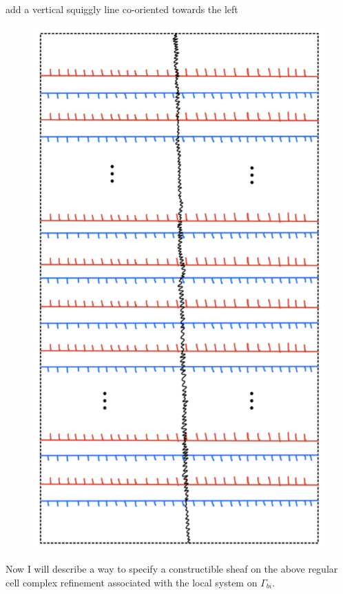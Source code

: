 add a vertical squiggly line co-oriented towards the left
\begin{figure}[H] 
    \centering
    \includegraphics[scale = 0.55]{diagrams/local_systems_on_as_diagrams/15.png} 
    \caption{}
    \label{fig:your-label}
\end{figure}


Now I will describe a way to specify a constructible sheaf on the above regular cell complex refinement associated with the local system on $\Gamma_{bi}$. 

